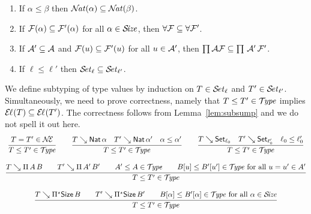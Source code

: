 \documentclass[acmsmall%
]{acmart}\settopmatter{printfolios=true}
\newcommand{\LONGVERSION}[1]{}
\begin{document}
\begin{lemma}[Subsumption]
\label{lem:subsump} \hfill
\begin{enumerate}
\item \label{it:natsub} If\/ $\alpha \leq \beta$ then $\NAT(\alpha) \subseteq \NAT(\beta)$.
\item \label{it:allsub} If\/ $\F(\alpha) \subseteq \F'(\alpha)$ for all $\alpha \in \SIZE$, then $\FORALL \F \subseteq \FORALL \F'$.
\item \label{it:pisub}  If\/ $\A' \subseteq \A$ and $\F(u) \subseteq \F'(u)$ for all $u \in \A'$, then $\PIAF \subseteq \PI\,\A'\,\F'$.
\item \label{it:usub}  If\/ $\ell \leq \ell'$ then $\SET[\ell] \subseteq \SET[\ell']$.
\end{enumerate}
\end{lemma}
\LONGVERSION{
\begin{proof}
  Propositions (\ref{it:natsub}--\ref{it:pisub}) are clear.
  For (\ref{it:usub}), prove $T = T' \in \SET[\ell']$ by induction on $T = T' \in \SET[\ell]$.
  For the base types this is direct, let us look at the function space.
\[
  \rul{T \evalsto \piT A B \qquad
      T' \evalsto \piT{A'}{B'} \qquad
      A = A' \in \SET[\ell] \qquad
      B[u] = B'[u'] \in \SET[\ell] \mforall u = u' \in \EL[\ell](A)
    }{T = T' \in \SET[\ell]}
\]
  By induction hypothesis, $A = A' \in \SET[\ell']$, and we have $\EL[\ell'](A) = \EL[\ell](A)$ by Lemma~\ref{lem:indep}.  Assuming $u = u' \in \EL(A)$, we get $B[u] = B'[u'] \in \SET[\ell']$ by induction hypothesis on $B[u] = B'[u'] \in \SET[\ell]$.
\end{proof}
}
We define subtyping of type values  by induction on $T \in \SET[\ell]$ and $T' \in \SET[\ell']$.
Simultaneously, we need to prove correctness, namely that $T \leq T' \in \TYPE$ implies $\EL(T) \subseteq \EL(T')$.  The correctness follows from Lemma~\ref{lem:subsump} and we do not spell it out here.
\begin{gather*}
  \ru{T = T' \in \NEE
    }{T \leq T' \in \TYPE}
\qquad
  \ru{T \evalsto \Nat \alpha \quad
      T' \evalsto \Nat \alpha' \quad
      \alpha \leq \alpha'
    }{T \leq T' \in \TYPE}
\qquad
  \ru{T \evalsto \Set[\ell_0] \quad
      T' \evalsto \Set[\ell_0'] \quad
      \ell_0 \leq \ell_0'
    }{T \leq T' \in \TYPE}
\\[2ex]
  \ru{T \evalsto \piT A B \qquad
      T' \evalsto \piT {A'}{B'} \qquad
      A' \leq A \in \TYPE \qquad
      B[u] \leq B'[u'] \in \TYPE \mforall u = u' \in A'
    }{T \leq T' \in \TYPE}
\\[2ex]
  \ru{T \evalsto \epiT \Size B \qquad
      T' \evalsto \epiT {\Size}{B'} \qquad
      B[\alpha] \leq B'[\alpha] \in \TYPE \mforall \alpha \in \SIZE
    }{T \leq T' \in \TYPE}
\end{gather*}
\end{document}
